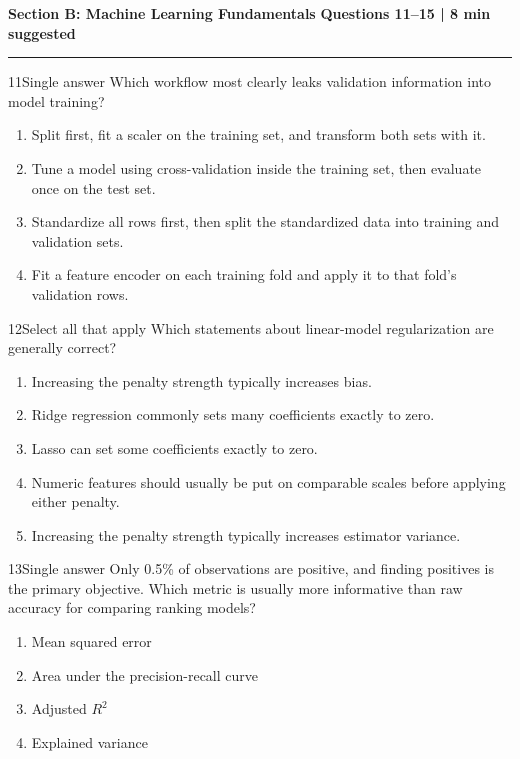\documentclass[10pt,a4paper]{article}
\newcommand{\sectionbanner}[2]{%
  \vspace{3mm}
  {\color{navy}\Large\bfseries #1}\hfill
  {\color{blue}\bfseries #2}
  \par\vspace{1mm}\color{line}\rule{\linewidth}{0.8pt}\color{ink}\vspace{2mm}
}
\begin{document}
\newpage
\sectionbanner{Section B: Machine Learning Fundamentals}{Questions 11--15 | 8 min suggested}

\begin{questionbox}{11}{Single answer}
Which workflow most clearly leaks validation information into model training?
\begin{enumerate}
  \item Split first, fit a scaler on the training set, and transform both sets with it.
  \item Tune a model using cross-validation inside the training set, then evaluate once on the test set.
  \item Standardize all rows first, then split the standardized data into training and validation sets.
  \item Fit a feature encoder on each training fold and apply it to that fold's validation rows.
\end{enumerate}
\end{questionbox}

\begin{questionbox}{12}{Select all that apply}
Which statements about linear-model regularization are generally correct?
\begin{enumerate}
  \item Increasing the penalty strength typically increases bias.
  \item Ridge regression commonly sets many coefficients exactly to zero.
  \item Lasso can set some coefficients exactly to zero.
  \item Numeric features should usually be put on comparable scales before applying either penalty.
  \item Increasing the penalty strength typically increases estimator variance.
\end{enumerate}
\end{questionbox}

\begin{questionbox}{13}{Single answer}
Only 0.5\% of observations are positive, and finding positives is the primary objective. Which metric is usually more informative than raw accuracy for comparing ranking models?
\begin{enumerate}
  \item Mean squared error
  \item Area under the precision-recall curve
  \item Adjusted $R^2$
  \item Explained variance
\end{enumerate}
\end{questionbox}
\end{document}
